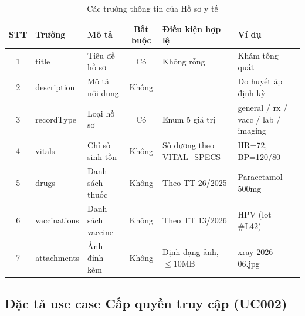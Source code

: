 \documentclass[../DoAn]{subfiles}
\begin{document}
\begin{table}[H]
\centering
\caption{Các trường thông tin của Hồ sơ y tế}
\label{tab:uc001-fields}
\small
\renewcommand{\arraystretch}{1.2}
\begin{tabular}{|c|p{2.5cm}|p{3.5cm}|c|p{2.2cm}|p{3cm}|}
\hline
\textbf{STT} & \textbf{Trường} & \textbf{Mô tả} & \textbf{Bắt buộc} & \textbf{Điều kiện hợp lệ} & \textbf{Ví dụ} \\ \hline
1 & title & Tiêu đề hồ sơ & Có & Không rỗng & Khám tổng quát \\ \hline
2 & description & Mô tả nội dung & Không & & Đo huyết áp định kỳ \\ \hline
3 & recordType & Loại hồ sơ & Có & Enum 5 giá trị & general / rx / vacc / lab / imaging \\ \hline
4 & vitals & Chỉ số sinh tồn & Không & Số dương theo VITAL\_SPECS & HR=72, BP=120/80 \\ \hline
5 & drugs & Danh sách thuốc & Không & Theo TT 26/2025 & Paracetamol 500mg \\ \hline
6 & vaccinations & Danh sách vaccine & Không & Theo TT 13/2026 & HPV (lot \#L42) \\ \hline
7 & attachments & Ảnh đính kèm & Không & Định dạng ảnh, $\le 10$MB & xray-2026-06.jpg \\ \hline
\end{tabular}
\end{table}

\subsection{Đặc tả use case Cấp quyền truy cập (UC002)}
\end{document}
